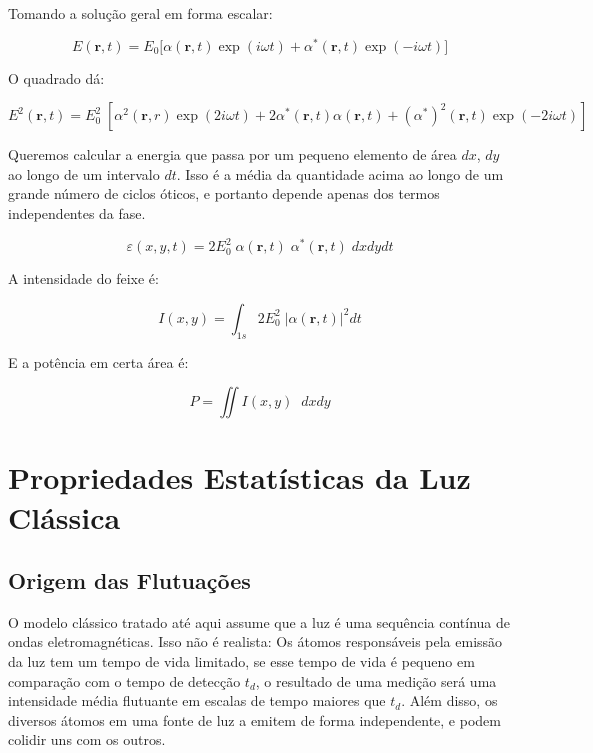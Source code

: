 \documentclass[12pt,a4paper]{report}
\begin{document}
Tomando a solução geral em forma escalar:

\begin{equation*}
    E(\textbf{r},t)=E_0\bigl[\alpha(\textbf{r},t)\exp(i\omega t)+\alpha^*(\textbf{r},t)\exp(-i\omega t)\bigr]
\end{equation*}

O quadrado dá:

\begin{equation*}
    E^2(\textbf{r},t)=E_0^2\;[\alpha^2(\textbf{r},r) \exp(2i\omega t)+2\alpha^*(\textbf{r},t)\alpha(\textbf{r},t)+(\alpha^*)^2(\textbf{r},t)\exp(-2i\omega t)]
\end{equation*}

Queremos calcular a energia que passa por um pequeno elemento de área $dx$, $dy$ ao longo de um intervalo $dt$. Isso é a média da quantidade acima ao longo de um grande número de ciclos óticos, e portanto depende apenas dos termos independentes da fase.

\begin{equation}
    \varepsilon(x,y,t)=2E_0^2\;\alpha(\textbf{r},t)\; \alpha^*(\textbf{r},t)\; dx dy dt
\end{equation}

A intensidade do feixe é:

\begin{equation}
    I(x,y)=\int_{1s}{2E_0^2\;|\alpha(\textbf{r},t)|^2}dt
\end{equation}

E a potência em certa área é:

\begin{equation}
    P=\iint{I(x,y)\;\;dx dy}
\end{equation}

\section{Propriedades Estatísticas da Luz Clássica}

\subsection{Origem das Flutuações}

O modelo clássico tratado até aqui assume que a luz é uma sequência contínua de ondas eletromagnéticas. Isso não é realista: Os átomos responsáveis pela emissão da luz tem um tempo de vida limitado, se esse tempo de vida é pequeno em comparação com o tempo de detecção $t_d$, o resultado de uma medição será uma intensidade média flutuante em escalas de tempo maiores que $t_d$. Além disso, os diversos átomos em uma fonte de luz a emitem de forma independente, e podem colidir uns com os outros.
\end{document}

